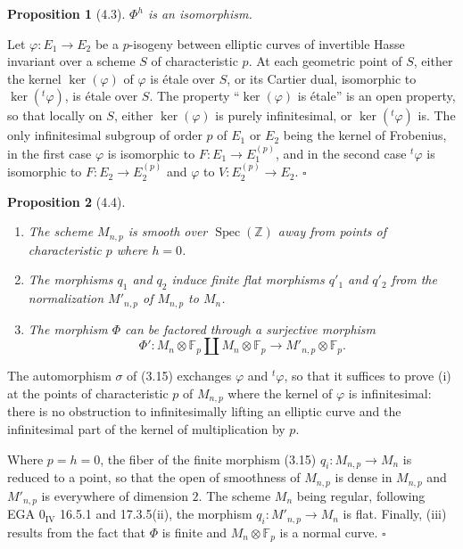 \documentclass[10pt]{article}
\newcommand{\Z}{\mathbb Z}
\newcommand{\Spec}{\operatorname{Spec}}
\newcommand{\QED}{\hfill$\square$}
\newcommand{\F}{\mathbb F}
\newtheorem*{proposition}{Proposition}
\begin{document}
\begin{proposition}[4.3]
$\Phi^h$ is an isomorphism.
\end{proposition}

Let $\varphi:E_1\to E_2$ be a $p$-isogeny between elliptic curves of invertible Hasse invariant over a scheme $S$ of characteristic $p$. At each geometric point of $S$, either the kernel $\ker(\varphi)$ of $\varphi$ is étale over $S$, or its Cartier dual, isomorphic to $\ker({}^{t}\!\varphi)$, is étale over $S$. The property ``$\ker(\varphi)$ is étale'' is an open property, so that locally on $S$, either $\ker(\varphi)$ is purely infinitesimal, or $\ker({}^{t}\!\varphi)$ is. The only infinitesimal subgroup of order $p$ of $E_1$ or $E_2$ being the kernel of Frobenius, in the first case $\varphi$ is isomorphic to $F:E_1\to E_1^{(p)}$, and in the second case ${}^{t}\!\varphi$ is isomorphic to $F:E_2\to E_2^{(p)}$ and $\varphi$ to $V:E_2^{(p)}\to E_2$. \QED

\begin{proposition}[4.4]
\leavevmode
\begin{enumerate}[label=(\roman*)]
\item The scheme $M_{n,p}$ is smooth over $\Spec(\Z)$ away from points of characteristic $p$ where $h=0$.
\item The morphisms $q_1$ and $q_2$ induce finite flat morphisms $q'_1$ and $q'_2$ from the normalization $M'_{n,p}$ of $M_{n,p}$ to $M_n$.
\item The morphism $\Phi$ can be factored through a surjective morphism
\[
\Phi':M_n\otimes\F_p\coprod M_n\otimes\F_p\to M'_{n,p}\otimes\F_p.
\]
\end{enumerate}
\end{proposition}

The automorphism $\sigma$ of (3.15) exchanges $\varphi$ and ${}^{t}\!\varphi$, so that it suffices to prove (i) at the points of characteristic $p$ of $M_{n,p}$ where the kernel of $\varphi$ is infinitesimal: there is no obstruction to infinitesimally lifting an elliptic curve and the infinitesimal part of the kernel of multiplication by $p$.

Where $p=h=0$, the fiber of the finite morphism (3.15) $q_i:M_{n,p}\to M_n$ is reduced to a point, so that the open of smoothness of $M_{n,p}$ is dense in $M_{n,p}$ and $M'_{n,p}$ is everywhere of dimension $2$. The scheme $M_n$ being regular, following EGA $0_{\mathrm{IV}}$ 16.5.1 and 17.3.5(ii), the morphism $q_i:M'_{n,p}\to M_n$ is flat. Finally, (iii) results from the fact that $\Phi$ is finite and $M_n\otimes\F_p$ is a normal curve. \QED
\end{document}
